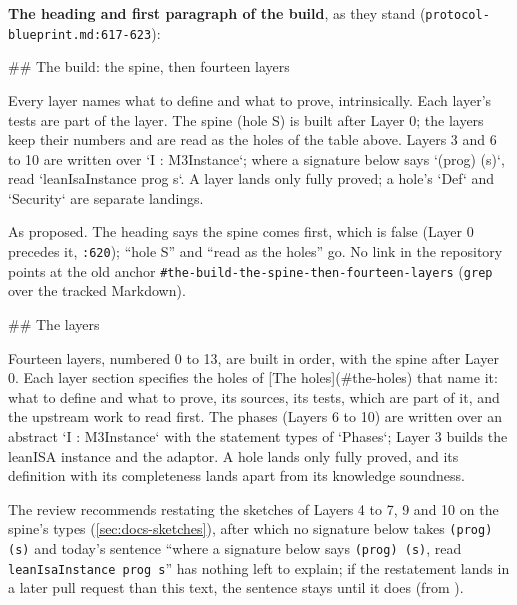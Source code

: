 \textbf{The heading and first paragraph of the build}, as they stand (\texttt{protocol-\allowbreak{}blueprint.\allowbreak{}md:\allowbreak{}617-\allowbreak{}623}):

\begin{srccode}
## The build: the spine, then fourteen layers

Every layer names what to define and what to prove, intrinsically. Each layer's tests are part
of the layer. The spine (hole S) is built after Layer 0; the layers
keep their numbers and are read as the holes of the table above. Layers 3 and 6 to 10 are written
over `I : M3Instance`; where a signature below says `(prog) (s)`, read `leanIsaInstance prog s`.
A layer lands only fully proved; a hole's `Def` and `Security` are separate landings.
\end{srccode}

\begin{sloppypar}
As proposed. The heading says the spine comes first, which is false (Layer 0 precedes it, \texttt{:\allowbreak{}620}); ``hole S'' and ``read as the holes'' go. No link in the repository points at the old anchor \texttt{\#the-\allowbreak{}build-\allowbreak{}the-\allowbreak{}spine-\allowbreak{}then-\allowbreak{}fourteen-\allowbreak{}layers} (\texttt{grep} over the tracked Markdown).
\end{sloppypar}

\begin{srccode}
## The layers

Fourteen layers, numbered 0 to 13, are built in order, with the spine after Layer 0. Each layer
section specifies the holes of [The holes](#the-holes) that name it: what to define and what to
prove, its sources, its tests, which are part of it, and the upstream work to read first. The
phases (Layers 6 to 10) are written over an abstract `I : M3Instance` with the statement types
of `Phases`; Layer 3 builds the leanISA instance and the adaptor. A hole lands only fully
proved, and its definition with its completeness lands apart from its knowledge soundness.
\end{srccode}

\begin{sloppypar}
The review recommends restating the sketches of Layers 4 to 7, 9 and 10 on the spine's types (\cref{sec:docs-sketches}), after which no signature below takes \texttt{(\allowbreak{}prog) (\allowbreak{}s)} and today's sentence ``where a signature below says \texttt{(\allowbreak{}prog) (\allowbreak{}s)}, read \texttt{lean\allowbreak{}Isa\allowbreak{}Instance prog s}'' has nothing left to explain; if the restatement lands in a later pull request than this text, the sentence stays until it does (from ).
\end{sloppypar}


